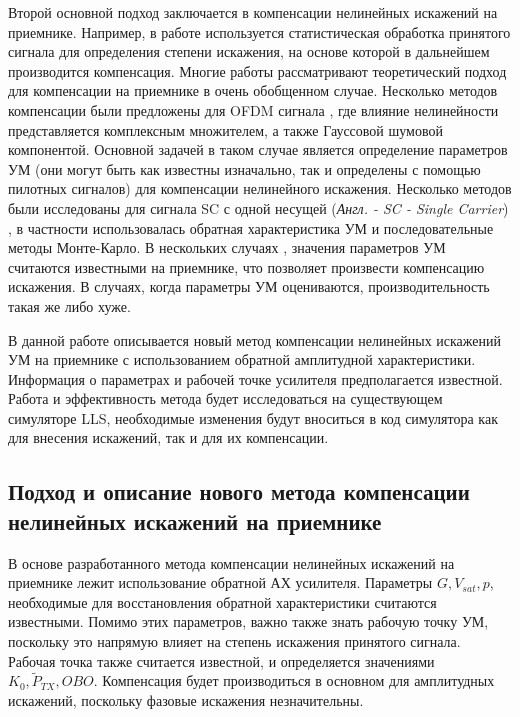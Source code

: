 Второй основной подход заключается в компенсации нелинейных искажений на
приемнике. Например, в работе \cite{maltsev2021} используется
статистическая обработка принятого сигнала для определения степени
искажения, на основе которой в дальнейшем производится компенсация. Многие
работы \cite[]{sharath2015, shabany2008,bhat2016,qi2010,gregorio2007,
bouhadda2015,drotar2010} рассматривают теоретический подход для компенсации
на приемнике в очень обобщенном случае. Несколько методов компенсации были
предложены для OFDM сигнала \cite[]{gregorio2007,bouhadda2015, drotar2010},
где влияние нелинейности представляется комплексным множителем, а также
Гауссовой шумовой компонентой. Основной задачей в таком случае является
определение параметров УМ (они могут быть как известны изначально, так и
определены с помощью пилотных сигналов) для компенсации нелинейного
искажения. Несколько методов были исследованы для сигнала SC с одной несущей
(\textit{Англ. - SC - Single Carrier}) \cite[]{sharath2015,
shabany2008,bhat2016, qi2010}, в частности использовалась обратная
характеристика УМ и последовательные методы Монте-Карло. В нескольких
случаях \cite[]{bhat2016, qi2010,gregorio2007}, значения параметров УМ
считаются известными на приемнике, что позволяет произвести компенсацию
искажения. В случаях, когда параметры УМ оцениваются, производительность
такая же либо хуже.

В данной работе описывается новый метод компенсации нелинейных искажений УМ на
приемнике с использованием обратной амплитудной характеристики. Информация
о параметрах и рабочей точке усилителя предполагается известной. Работа и
эффективность метода будет исследоваться на существующем симуляторе
LLS, необходимые изменения будут вноситься в код симулятора
как для внесения искажений, так и для их компенсации.





\subsection{Подход и описание нового метода компенсации
нелинейных искажений на приемнике}
В основе разработанного метода компенсации нелинейных искажений на
приемнике лежит использование обратной АХ усилителя. Параметры $G, V_{sat},
p$, необходимые для восстановления обратной характеристики считаются
известными. Помимо этих параметров, важно также знать рабочую точку УМ,
поскольку это напрямую влияет на степень искажения принятого сигнала.
Рабочая точка также считается известной, и определяется значениями $K_0,
\tilde{P}_{TX}, OBO$. Компенсация будет производиться в основном для
амплитудных искажений, поскольку фазовые искажения незначительны.

